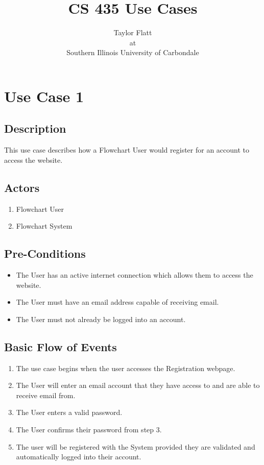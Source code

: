 \documentclass[a4paper,11pt]{article}
\title{CS 435 Use Cases}
\author{
Taylor Flatt \\
at \\
Southern Illinois University of Carbondale
}
\begin{document}
\maketitle
\tableofcontents

\hspace{1cm} 
\newline
\newline

\section{Use Case 1}
\subsection{Description}
This use case describes how a Flowchart User would register for an account to access the website.

\subsection{Actors}
\begin{enumerate}
\item Flowchart User
\item Flowchart System
\end{enumerate}

\subsection{Pre-Conditions}
\begin{itemize}
\item The User has an active internet connection which allows them to access the website.
\item The User must have an email address capable of receiving email.
\item The User must not already be logged into an account.
\end{itemize}

\subsection{Basic Flow of Events}
\begin{enumerate}
\item The use case begins when the user accesses the Registration webpage.
\item The User will enter an email account that they have access to and are able to receive email from.
\item The User enters a valid password.
\item The User confirms their password from step 3.
\item The user will be registered with the System provided they are validated and automatically logged into their account.
\end{enumerate}
\end{document}
